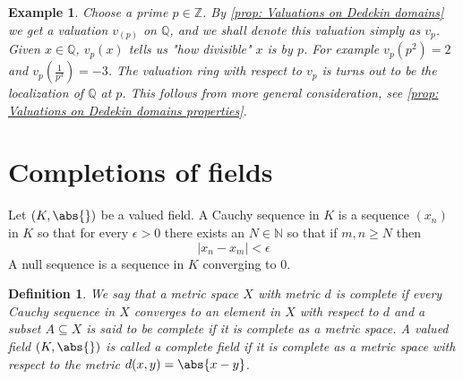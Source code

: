 \documentclass{article}
\newtheorem{definition}{Definition}[section]
\newtheorem{example}{Example}[section]
\newcommand{\mbb}[1]{\mathbb{#1}}
\numberwithin{equation}{section}
\begin{document}
\begin{example}\label{ex: Almost the p-adic numbers}
    Choose a prime $p \in \mbb Z$. By \cref{prop: Valuations on Dedekin domains} we get a valuation $v_{(p)}$ on $\mbb Q$, and we shall denote this valuation simply as $v_p$. Given $x \in \mbb Q$, $v_p(x)$ tells us "how divisible" $x$ is by $p$. For example $v_p(p^2) = 2$ and $v_p(\frac{1}{p^3}) = -3$. The valuation ring with respect to $v_p$ is turns out to be the localization of $\mbb Q$ at $p$. This follows from more general consideration, see \cref{prop: Valuations on Dedekin domains properties}.
\end{example}

\section{Completions of fields}\label{sec: Completions of fields}


Let $(K, \abs{})$ be a valued field. A Cauchy sequence in $K$ is a sequence $(x_n)$ in $K$ so that for every $\epsilon > 0$ there exists an $N \in \mbb N$ so that if $m,n \geq N$ then
$$|x_n - x_m| < \epsilon$$
A null sequence is a sequence in $K$ converging to 0.


\begin{definition}
    We say that a metric space $X$ with metric $d$ is complete if every Cauchy sequence in $X$ converges to an element in $X$ with respect to $d$ and a subset $A \subseteq X$ is said to be complete if it is complete as a metric space. A valued field $(K, \abs{})$ is called a complete field if it is complete as a metric space with respect to the metric $d(x,y) = \abs{x - y}$.
\end{definition}
\end{document}
